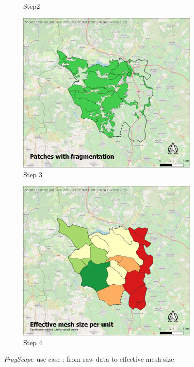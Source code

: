 \documentclass[11pt]{article}
\newcommand{\tool}{\emph{FragScape}}
\begin{document}
\begin{figure}[h!]
\begin{subfigure}[b]{.48\textwidth}
      \caption{Step2}
   \end{subfigure}
   \begin{subfigure}[b]{.48\textwidth}
      \includegraphics[width=\textwidth]{pictures/fragmPatches.png}
      \caption{Step 3}
   \end{subfigure}
   \begin{subfigure}[b]{.48\textwidth}
      \includegraphics[width=\textwidth]{pictures/results.png}
      \caption{Step 4}
   \end{subfigure}
   \caption{\tool\ use case : from raw data to effective mesh size}
   \label{fig:usecase}
\end{figure}
\end{document}
